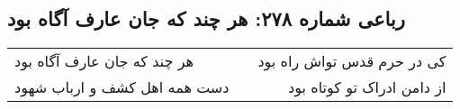 \begin{center}
\section*{رباعی شماره ۲۷۸: هر چند که جان عارف آگاه بود}
\label{sec:sh278}
\begin{longtable}{l p{0.5cm} r}
هر چند که جان عارف آگاه بود
&&
کی در حرم قدس تواش راه بود
\\
دست همه اهل کشف و ارباب شهود
&&
از دامن ادراک تو کوتاه بود
\\
\end{longtable}
\end{center}
